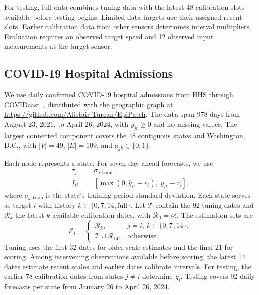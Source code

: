 \documentclass[conference]{IEEEtran}
\begin{document}
For testing, full data combines tuning data with the latest 48 calibration slots available before testing begins. Limited-data targets use their assigned recent slots. Earlier calibration data from other sensors determines interval multipliers. Evaluation requires an observed target speed and 12 observed input measurements at the target sensor.

\subsection{COVID-19 Hospital Admissions}
\label{sec:second-application-setup}

We use daily confirmed COVID-19 hospital admissions from HHS through COVIDcast~\cite{reinhart2021covidcast}, distributed with the geographic graph at \url{https://github.com/Alistair-Turcan/EpiPatch}. The data span 978 days from August 23, 2021, to April 26, 2024, with $y_{jt}\geq0$ and no missing values. The largest connected component covers the 48 contiguous states and Washington, D.C., with $|V|=49$, $|E|=109$, and $a_{jk}\in\{0,1\}$.

Each node represents a state. For seven-day-ahead forecasts, we use
\begin{equation}
\begin{aligned}
\tau_j&=\sigma_{j,\mathrm{train}},\\
I_{it}&=[\max(0,\hat y_{it}-r_i),\;\hat y_{it}+r_i],
\end{aligned}
\end{equation}
where $\sigma_{j,\mathrm{train}}$ is the state's training-period standard deviation. Each state serves as target $i$ with history $k\in\{0,7,14,\mathrm{full}\}$. Let $\mathcal T$ contain the 92 tuning dates and $\mathcal R_k$ the latest $k$ available calibration dates, with $\mathcal R_0=\varnothing$. The estimation sets are
\begin{equation}
\mathcal E_j=
\begin{cases}
\mathcal R_k, & j=i,\ k\in\{0,7,14\},\\
\mathcal T\cup\mathcal R_{14}, & \text{otherwise}.
\end{cases}
\end{equation}
Tuning uses the first 32 dates for older scale estimates and the final 21 for scoring. Among intervening observations available before scoring, the latest 14 dates estimate recent scales and earlier dates calibrate intervals. For testing, the earlier 78 calibration dates from states $j\ne i$ determine $q_i$. Testing covers 92 daily forecasts per state from January 26 to April 26, 2024.
\end{document}
